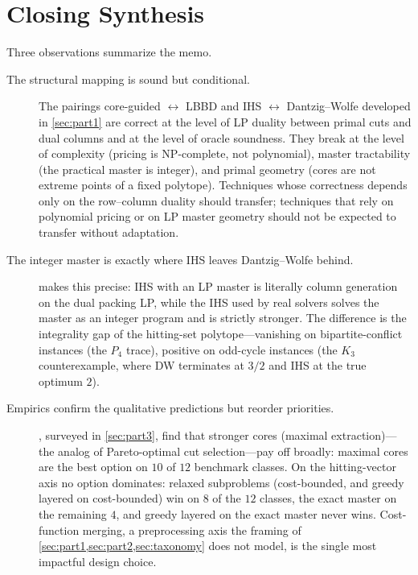 \section{Closing Synthesis}
\label{sec:closing}

Three observations summarize the memo.

\begin{description}
\item[The structural mapping is sound but conditional.] The pairings
core-guided $\leftrightarrow$ LBBD and IHS $\leftrightarrow$ Dantzig--Wolfe
developed in \cref{sec:part1} are correct at the level of LP duality between
primal cuts and dual columns and at the level of oracle soundness. They
break at the level of complexity (pricing is NP-complete, not polynomial),
master tractability (the practical master is integer), and primal geometry
(cores are not extreme points of a fixed polytope). Techniques whose
correctness depends only on the row--column duality should transfer;
techniques that rely on polynomial pricing or on LP master geometry should
not be expected to transfer without adaptation.

\item[The integer master is exactly where IHS leaves Dantzig--Wolfe
behind.]  makes this precise: IHS with an LP master is
literally column generation on the dual packing LP, while the IHS used by
real solvers solves the master as an integer program and is strictly
stronger. The difference is the integrality gap of the hitting-set
polytope---vanishing on bipartite-conflict instances (the $P_4$ trace),
positive on odd-cycle instances (the $K_3$ counterexample, where DW
terminates at $3/2$ and IHS at the true optimum $2$).

\item[Empirics confirm the qualitative predictions but reorder
priorities.] , surveyed in \cref{sec:part3},
find that stronger cores (maximal extraction)---the analog of
Pareto-optimal cut selection---pay off broadly: maximal cores are the
best option on $10$ of $12$ benchmark classes. On the hitting-vector axis no
option dominates: relaxed subproblems (cost-bounded, and greedy layered on
cost-bounded) win on $8$ of the $12$ classes, the exact master on the
remaining $4$, and greedy layered on the exact master never wins.
Cost-function merging, a preprocessing axis the framing of
\cref{sec:part1,sec:part2,sec:taxonomy} does not model, is the single most
impactful design choice.


\end{description}
